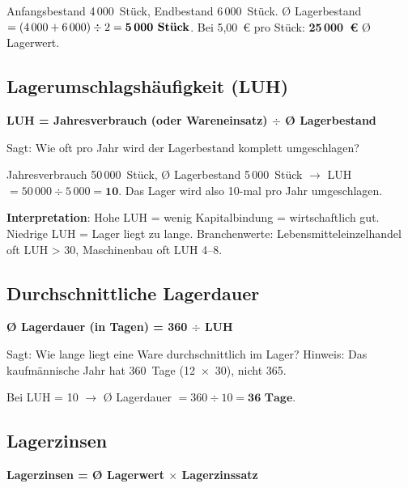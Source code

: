 \documentclass[11pt, a4paper]{article}
\begin{document}
\begin{beispiel}
Anfangsbestand 4\,000~Stück, Endbestand 6\,000~Stück. Ø Lagerbestand $= (4\,000 + 6\,000) \div 2 = \textbf{5\,000 Stück}$. Bei 5,00~€ pro Stück: \textbf{25\,000~€} Ø Lagerwert.
\end{beispiel}

\subsection{Lagerumschlagshäufigkeit (LUH)}

\begin{merksatz}[title={Formel}]
\textbf{LUH = Jahresverbrauch (oder Wareneinsatz) $\div$ Ø Lagerbestand}
\end{merksatz}

Sagt: Wie oft pro Jahr wird der Lagerbestand komplett umgeschlagen?

\begin{beispiel}
Jahresverbrauch 50\,000~Stück, Ø Lagerbestand 5\,000~Stück $\to$ LUH $= 50\,000 \div 5\,000 = \textbf{10}$. Das Lager wird also 10-mal pro Jahr umgeschlagen.
\end{beispiel}

\textbf{Interpretation}: Hohe LUH = wenig Kapitalbindung = wirtschaftlich gut. Niedrige
LUH = Lager liegt zu lange. Branchenwerte: Lebensmitteleinzelhandel oft LUH > 30,
Maschinenbau oft LUH 4--8.

\subsection{Durchschnittliche Lagerdauer}

\begin{merksatz}[title={Formel}]
\textbf{Ø Lagerdauer (in Tagen) = 360 $\div$ LUH}
\end{merksatz}

Sagt: Wie lange liegt eine Ware durchschnittlich im Lager? Hinweis: Das kaufmännische
Jahr hat 360~Tage (12~$\times$~30), nicht 365.

\begin{beispiel}
Bei LUH = 10 $\to$ Ø Lagerdauer $= 360 \div 10 = \textbf{36 Tage}$.
\end{beispiel}

\subsection{Lagerzinsen}

\begin{merksatz}[title={Formel (vereinfacht für Jahr)}]
\textbf{Lagerzinsen = Ø Lagerwert $\times$ Lagerzinssatz}
\end{merksatz}
\end{document}
